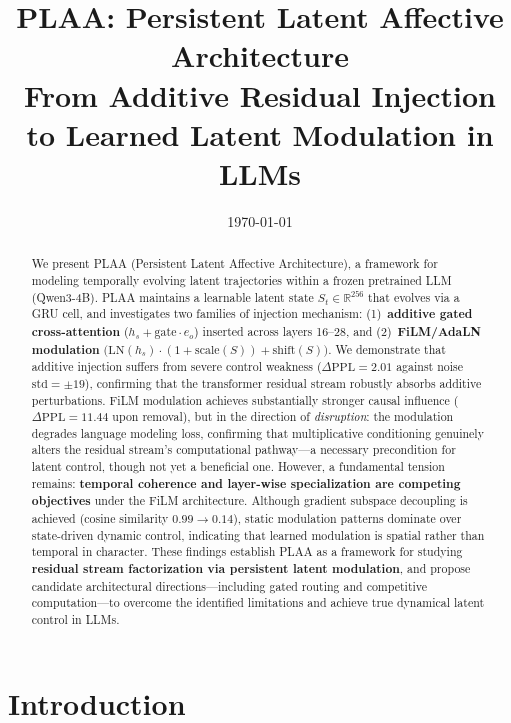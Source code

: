 \documentclass[11pt,a4paper]{article}
\title{
  \textbf{PLAA: Persistent Latent Affective Architecture}\\[0.4em]
  \large From Additive Residual Injection to Learned Latent Modulation in LLMs
}
\author{
  Xiao Ouyang \textup{(\begin{CJK}{UTF8}{gbsn}欧阳潇\end{CJK})}
}
\date{\today}
\newcommand{\R}{\mathbb{R}}
\newcommand{\St}{S_t}
\begin{document}
\maketitle
\thispagestyle{empty}

\begin{abstract}
We present PLAA (Persistent Latent Affective Architecture), a framework for modeling
temporally evolving latent trajectories within a frozen pretrained LLM (Qwen3-4B).
PLAA maintains a learnable latent state $\St \in \R^{256}$ that evolves via a GRU
cell, and investigates two families of injection mechanism: (1)~\textbf{additive
gated cross-attention} ($h_s + \mathrm{gate} \cdot e_o$) inserted across layers
16--28, and (2)~\textbf{FiLM/AdaLN modulation}
$\bigl(\mathrm{LN}(h_s)\cdot(1+\mathrm{scale}(S))+\mathrm{shift}(S)\bigr)$.
We demonstrate that additive injection suffers from severe control weakness
($\Delta\mathrm{PPL} = 2.01$ against noise $\mathrm{std} = \pm 19$), confirming
that the transformer residual stream robustly absorbs additive perturbations.
FiLM modulation achieves substantially stronger causal influence
($\Delta\mathrm{PPL} = 11.44$ upon removal), but in the direction of
\emph{disruption}: the modulation degrades language modeling loss, confirming that
multiplicative conditioning genuinely alters the residual stream's computational
pathway---a necessary precondition for latent control, though not yet a beneficial
one. However, a fundamental tension
remains: \textbf{temporal coherence and layer-wise specialization are competing
objectives} under the FiLM architecture. Although gradient subspace decoupling is
achieved (cosine similarity $0.99 \to 0.14$), static modulation patterns dominate
over state-driven dynamic control, indicating that learned modulation is spatial
rather than temporal in character. These findings establish PLAA as a framework for
studying \textbf{residual stream factorization via persistent latent modulation}, and
propose candidate architectural directions---including gated routing and competitive computation---to overcome the identified limitations and achieve true dynamical
latent control in LLMs.
\end{abstract}

\newpage
\setcounter{page}{1}

\section{Introduction}
\end{document}

